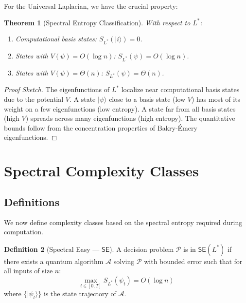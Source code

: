 \documentclass[11pt,a4paper]{article}
\theoremstyle{plain}
\newtheorem{theorem}{Theorem}[section]
\theoremstyle{definition}
\newtheorem{definition}[theorem]{Definition}
\theoremstyle{remark}
\newcommand{\ket}[1]{|#1\rangle}
\newcommand{\SE}{\mathsf{SE}}
\begin{document}
For the Universal Laplacian, we have the crucial property:

\begin{theorem}[Spectral Entropy Classification]\label{thm:entropy-classification}
With respect to $L^*$:
\begin{enumerate}[label=(\roman*),noitemsep]
    \item Computational basis states: $S_{L^*}(\ket{i}) = 0$.
    \item States with $V(\psi) = O(\log n)$: $S_{L^*}(\psi) = O(\log n)$.
    \item States with $V(\psi) = \Theta(n)$: $S_{L^*}(\psi) = \Theta(n)$.
\end{enumerate}
\end{theorem}

\begin{proof}[Proof Sketch]
The eigenfunctions of $L^*$ localize near computational basis states due to the potential $V$. A state $\ket{\psi}$ close to a basis state (low $V$) has most of its weight on a few eigenfunctions (low entropy). A state far from all basis states (high $V$) spreads across many eigenfunctions (high entropy). The quantitative bounds follow from the concentration properties of Bakry-\'Emery eigenfunctions.
\end{proof}

\section{Spectral Complexity Classes}\label{sec:classes}

\subsection{Definitions}

We now define complexity classes based on the spectral entropy required during computation.

\begin{definition}[Spectral Easy --- $\SE$]
A decision problem $\mathcal{P}$ is in $\SE(L^*)$ if there exists a quantum algorithm $\mathcal{A}$ solving $\mathcal{P}$ with bounded error such that for all inputs of size $n$:
\begin{equation}
    \max_{t \in [0,T]} S_{L^*}(\psi_t) = O(\log n)
\end{equation}
where $\{\ket{\psi_t}\}$ is the state trajectory of $\mathcal{A}$.
\end{definition}
\end{document}
